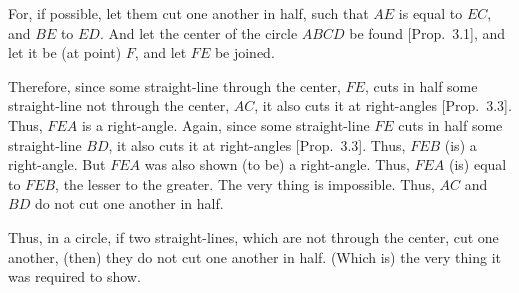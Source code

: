 \begin{Parallel}{}{}
{For, if possible, let them cut one another in half, such that $AE$ is equal to $EC$, and
$BE$ to $ED$. And let the center of the circle $ABCD$ be found [Prop.~3.1], and let it be (at point) $F$, and let $FE$ be joined.

Therefore, since some straight-line through the center, $FE$, cuts in half
some straight-line not through the center, $AC$, it also cuts it at right-angles
[Prop.~3.3]. Thus, $FEA$ is a right-angle. Again, since some straight-line
$FE$ cuts in half some straight-line $BD$, it also cuts it at right-angles [Prop.~3.3]. Thus, $FEB$ (is) a right-angle. But $FEA$ was also shown (to be) a right-angle. Thus, $FEA$ (is) equal to $FEB$, the lesser to the greater.
The very thing is impossible. Thus, $AC$ and $BD$ do not cut one another in half.

Thus, in a circle, if two straight-lines, which are not through the center, cut
one another, (then) they do not cut one another in half. (Which is) the very
thing it was required to show.}
\end{Parallel}

